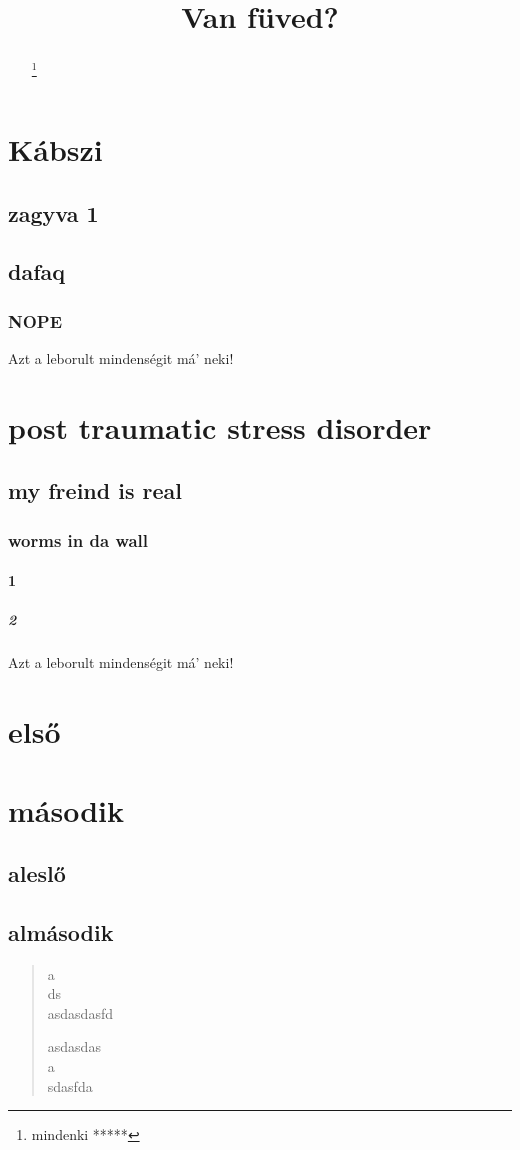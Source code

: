 \documentclass[twocolumn,twoside]{article}
\title{Van füved?}
\begin{document}
\maketitle
\begin{abstract}
\texttt{\lipsum[3-4]}
\renewcommand{\thefootnote}{\fnsymbol{footnote}}
\footnote{mindenki *****}
\end{abstract}
\setcounter{secnumdepth}{10}
\setcounter{tocdepth}{10}
\renewcommand{\contentsname}{MI FOLYIK ITT GYÖNGYÖSÖN!?}
\tableofcontents
\clearpage
{}
\section{Kábszi}
\subsection{zagyva 1}
\hulipsum[3]
\subsection{dafaq}
\hulipsum[4]
\subsubsection{NOPE}
\hulipsum[1]
\marginparwidth 3cm
\marginparsep 0.5cm
Azt a leborult mindenségit má' neki!
\section[ptsd]{post traumatic stress disorder}
\subsection{my freind is real}
\subsubsection{worms in da wall}
\paragraph{1}
\subparagraph{2}
\marginparwidth 3cm
\marginparsep 0.5cm
Azt a leborult mindenségit má' neki!
\hulipsum[2]
\quote
\lipsum[5-6]
\quotation
\hulipsum[6-7]
\tableofcontents
\appendix
\section{első}
\section{második}
\subsection{aleslő}
\subsection{almásodik}
\begin{verse}
a\\
ds\\
asdasdasfd

asdasdas\\
a\\
sdasfda
\end{verse}
\end{document}

